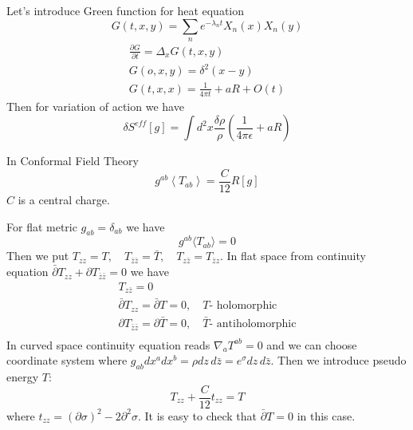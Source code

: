 \documentclass[a4paper,12pt]{article}
\theoremstyle{definition} \newtheorem{Def}{Definition}
\begin{document}
Let's introduce Green function for heat equation
\begin{equation}
  \label{eq:43}
  G(t,x,y)=\sum_n e^{-\lambda_n t}X_n(x) X_n(y)
\end{equation}
\begin{equation}
  \label{eq:44}
  \begin{split}
    \frac{\partial G}{\partial t}=\Delta_x G(t,x,y)\\
    G(o,x,y)=\delta^2 (x-y)\\
    G(t,x,x)=\frac{1}{4\pi t}+aR+O(t)
  \end{split}
\end{equation}
Then for variation of action we have
\begin{equation}
  \label{eq:45}
  \delta S^{eff}[g]=\int d^2x \frac{\delta\rho}{\rho}\left(\frac{1}{4\pi\epsilon}+aR\right)
\end{equation}



In Conformal Field Theory 
\begin{equation}
  \label{eq:46}
  g^{ab}\left<T_{ab}\right>=\frac{C}{12}R[g]
\end{equation}
$C$ is a central charge.

For flat metric $g_{ab}=\delta_{ab}$ we have
\begin{equation}
  \label{eq:47}
  g^{ab}\langle T_{ab} \rangle=0
\end{equation}
Then we put $T_{zz}=T,\quad T_{\bar{z}\bar{z}}=\bar{T},\quad T_{z\bar{z}}=T_{\bar{z}z}$. In flat space from continuity equation $\bar{\partial}T_{zz}+\partial T_{\bar{z}\bar{z}}=0$ we have
\begin{equation}
  \label{eq:49}
  \begin{split}
    T_{z\bar{z}}=0\\
    \bar{\partial}T_{zz}=\bar{\partial}T=0,\quad T \mbox{- holomorphic}\\
    \partial T_{\bar{z}\bar{z}}=\partial \bar{T}=0,\quad \bar{T} \mbox{- antiholomorphic}\\
  \end{split}
\end{equation}
In curved space continuity equation reads $\nabla_a T^{ab}=0$ and we can choose coordinate system where $g_{ab}dx^a dx^b = \rho dz\, d\bar{z}=e^{\sigma}dz\,d\bar{z}$. Then we introduce pseudo energy $T$:
\begin{equation}
  \label{eq:50}
  T_{zz}+\frac{C}{12}t_{zz}=T
\end{equation}
where $t_{zz}=(\partial \sigma)^2-2\partial^2 \sigma$. It is easy to check that $\bar{\partial}T=0$ in this case.
\end{document}

